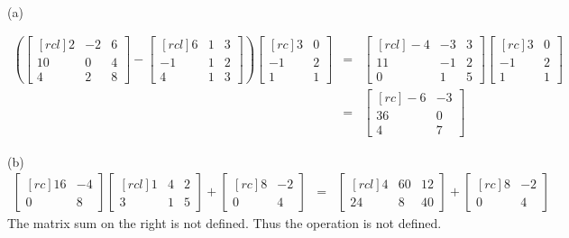 \begin{solution}
\ \\
(a) \ 

\begin{eqnarray*}
\left(\begin{bmatrix}[rcl]
2&-2&6\\
10&0&4\\
4&2&8
\end{bmatrix}
-
\begin{bmatrix}[rcl]
6&1&3\\
-1&1&2\\
4&1&3
\end{bmatrix}
\right)
\begin{bmatrix}[rc]
3&0\\
-1&2\\
1&1
\end{bmatrix}
&=& 
\begin{bmatrix}[rcl]
-4&-3&3\\
11&-1&2\\
0&1&5
\end{bmatrix}
\begin{bmatrix}[rc]
3&0\\
-1&2\\
1&1
\end{bmatrix}\\
&=&
\begin{bmatrix}[rc]
-6&-3\\
36&0\\
4&7
\end{bmatrix}
\end{eqnarray*}


\noindent (b) 
\begin{eqnarray*}
\begin{bmatrix}[rc]
16&-4\\
0&8
\end{bmatrix}
\begin{bmatrix}[rcl]
1&4&2\\
3&1&5
\end{bmatrix}
+
\begin{bmatrix}[rc]
8&-2\\
0&4
\end{bmatrix}
&=&
\begin{bmatrix}[rcl]
4&60&12\\
24&8&40
\end{bmatrix}
+
\begin{bmatrix}[rc]
8&-2\\
0&4
\end{bmatrix}
\end{eqnarray*}
The matrix sum on the right is not defined. Thus the operation is not defined. 


\end{solution}
